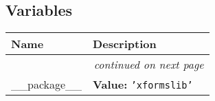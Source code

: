   \subsection{Variables}

    \vspace{-1cm}
\hspace{\varindent}\begin{longtable}{|p{\varnamewidth}|p{\vardescrwidth}|l}
\cline{1-2}
\cline{1-2} \centering \textbf{Name} & \centering \textbf{Description}& \\
\cline{1-2}
\endhead\cline{1-2}\multicolumn{3}{r}{\small\textit{continued on next page}}\\\endfoot\cline{1-2}
\endlastfoot\raggedright \_\-\_\-p\-a\-c\-k\-a\-g\-e\-\_\-\_\- & \raggedright \textbf{Value:} 
{\tt \texttt{'}\texttt{xformslib}\texttt{'}}&\\
\cline{1-2}
\end{longtable}

